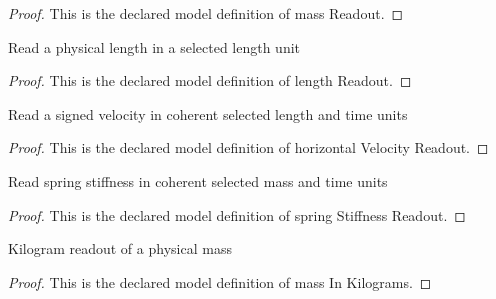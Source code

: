 \begin{proof}
  This is the declared model definition of mass Readout.
\end{proof}
\begin{definition}
  \label{def:physics:phyx-mini-0763:phyxminiproblems-problemphyxmini0763-lengthreadout}
  Read a physical length in a selected length unit
\end{definition}
\begin{proof}
  This is the declared model definition of length Readout.
\end{proof}
\begin{definition}
  \label{def:physics:phyx-mini-0763:phyxminiproblems-problemphyxmini0763-horizontalvelocityreadout}
  Read a signed velocity in coherent selected length and time units
\end{definition}
\begin{proof}
  This is the declared model definition of horizontal Velocity Readout.
\end{proof}
\begin{definition}
  \label{def:physics:phyx-mini-0763:phyxminiproblems-problemphyxmini0763-springstiffnessreadout}
  Read spring stiffness in coherent selected mass and time units
\end{definition}
\begin{proof}
  This is the declared model definition of spring Stiffness Readout.
\end{proof}
\begin{definition}
  \label{def:physics:phyx-mini-0763:phyxminiproblems-problemphyxmini0763-massinkilograms}
  Kilogram readout of a physical mass
\end{definition}
\begin{proof}
  This is the declared model definition of mass In Kilograms.
\end{proof}

